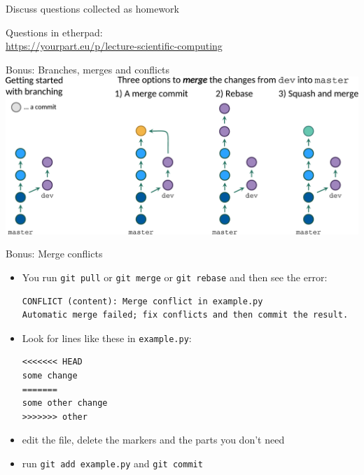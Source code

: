 \begin{frame}[fragile]{Discuss questions collected as homework}

    Questions in etherpad:\\
    \href{https://yourpart.eu/p/lecture-scientific-computing}{https://yourpart.eu/p/lecture-scientific-computing}
\end{frame}


\begin{frame}[fragile]{Bonus: Branches, merges and conflicts}
    \includegraphics[width=\textwidth]{images/merging-diagram.pdf}
\end{frame}

\begin{frame}[fragile]{Bonus: Merge conflicts}
    \begin{itemize}
        \item You run \verb|git pull| or \verb|git merge| or \verb|git rebase| and then see the error:
            {\small
            \begin{verbatim}CONFLICT (content): Merge conflict in example.py
Automatic merge failed; fix conflicts and then commit the result.\end{verbatim}\pause
            }
        \item Look for lines like these in \verb|example.py|:
\begin{verbatim}
<<<<<<< HEAD
some change
=======
some other change
>>>>>>> other\end{verbatim}
        \item edit the file, delete the markers and the parts you don't need\pause
        \item run \verb|git add example.py| and \verb|git commit|
    \end{itemize}
\end{frame}


